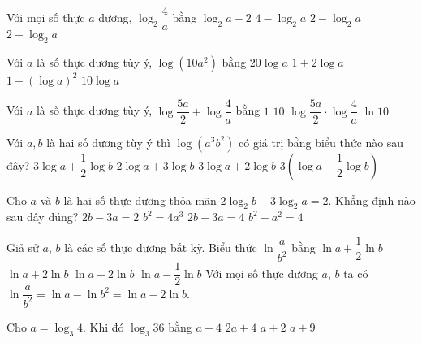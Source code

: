 \begin{ex}
	Với mọi số thực $a$ dương, $\log_2 {\dfrac{4}{a}} $ bằng
	\choice
	{$ \log_2 a - 2 $}
	{$4-\log_2 a$}	
	{\True $2-\log_2 a$}
	{$2+\log_2 a$}
\end{ex}

\begin{ex}
	Với $a$ là số thực dương tùy ý, $\log\left(10a^2\right)$ bằng
	\choice
	{$20\log a$}
	{\True $1+2\log a$}
	{$1+\left(\log a\right)^2$}
	{$10\log a$}
\end{ex}
\begin{ex}
	Với $a$ là số thực dương tùy ý, $\log \dfrac{5 a}{2}+\log \dfrac{4}{a}$ bằng
	\choice
	{\True $1 $}
	{$ 10 $}
	{$\log \dfrac{5 a}{2} \cdot \log \dfrac{4}{a}$}
	{$\ln10$}
\end{ex}

\begin{ex}
	Với $a, b$ là hai số dương tùy ý thì $\log \left(a^3 b^2\right)$ có giá trị bằng biểu thức nào sau đây?
	\choice
	{$3 \log a+\dfrac{1}{2} \log b $}
	{$2 \log a+3 \log b $}
	{\True $3 \log a+2 \log b $}
	{$3\left(\log a+\dfrac{1}{2} \log b\right) $}
\end{ex}
\begin{ex}
	Cho $a$ và $b$ là hai số thực dương thỏa mãn $2\log_2b-3\log_2a=2$. Khẳng định nào sau đây đúng?
	\choice
	{$2b-3a=2$}
	{\True $b^2=4a^3$}
	{$2b-3a=4$}
	{$b^2-a^2=4$}
\end{ex}
\begin{ex}
	Giả sử $a$, $b$ là các số thực dương bất kỳ. Biểu thức $\ln\dfrac{a}{b^2}$ bằng
	\choice
	{$\ln a+\dfrac{1}{2}\ln b$}
	{$\ln a+2\ln b$}
	{\True $\ln a-2\ln b$}
	{$\ln a-\dfrac{1}{2}\ln b$}
	\loigiai
	{
		Với mọi số thực dương $a$, $b$ ta có $\ln \dfrac{a}{b^2}=\ln a-\ln b^2 = \ln a-2\ln b$.
	}
\end{ex}
\begin{ex}
	Cho $a=\log_3 4$. Khi đó $\log_3 36$ bằng
	\choice
	{$a+4$}
	{$2a+4$}
	{\True $a+2$}
	{$a+9$}
\end{ex}

